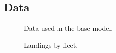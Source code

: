 \documentclass[
]{scrartcl}
\begin{document}
\newpage

\subsection{Data}\label{data-1}

\begin{figure}[H]


\caption{\label{fig-data}Data used in the base model.}

\end{figure}%

\begin{figure}[H]


\caption{\label{fig-landings}Landings by fleet.}

\end{figure}%
\end{document}
